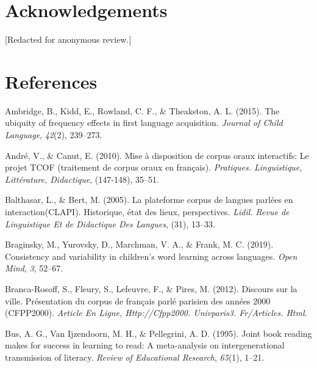 \documentclass[10pt, letterpaper]{article}
\newenvironment{CSLReferences}%
  {}%
  {\par}
\begin{document}
\hypertarget{acknowledgements}{%
\section{Acknowledgements}\label{acknowledgements}}

{[}Redacted for anonymous review.{]}

\hypertarget{references}{%
\section{References}\label{references}}

\setlength{\parindent}{-0.1in} 
\setlength{\leftskip}{0.125in}

\noindent

\hypertarget{refs}{}
\begin{CSLReferences}{1}{0}
\leavevmode\hypertarget{ref-ambridge2015ubiquity}{}%
Ambridge, B., Kidd, E., Rowland, C. F., \& Theakston, A. L. (2015). The
ubiquity of frequency effects in first language acquisition.
\emph{Journal of Child Language}, \emph{42}(2), 239--273.

\leavevmode\hypertarget{ref-andre2010mise}{}%
André, V., \& Canut, E. (2010). Mise {à} disposition de corpus oraux
interactifs: Le projet TCOF (traitement de corpus oraux en fran{ç}ais).
\emph{Pratiques. Linguistique, Litt{é}rature, Didactique}, (147-148),
35--51.

\leavevmode\hypertarget{ref-balthasar2005plateforme}{}%
Balthasar, L., \& Bert, M. (2005). La plateforme corpus de langues
parl{é}es en interaction(CLAPI). Historique, {é}tat des lieux,
perspectives. \emph{Lidil. Revue de Linguistique Et de Didactique Des
Langues}, (31), 13--33.

\leavevmode\hypertarget{ref-braginsky2019consistency}{}%
Braginsky, M., Yurovsky, D., Marchman, V. A., \& Frank, M. C. (2019).
Consistency and variability in children's word learning across
languages. \emph{Open Mind}, \emph{3}, 52--67.

\leavevmode\hypertarget{ref-branca2012discours}{}%
Branca-Rosoff, S., Fleury, S., Lefeuvre, F., \& Pires, M. (2012).
Discours sur la ville. Pr{é}sentation du corpus de fran{ç}ais parl{é}
parisien des ann{é}es 2000 (CFPP2000). \emph{Article En Ligne,
Http://Cfpp2000. Univparis3. Fr/Articles. Html}.

\leavevmode\hypertarget{ref-bus1995joint}{}%
Bus, A. G., Van Ijzendoorn, M. H., \& Pellegrini, A. D. (1995). Joint
book reading makes for success in learning to read: A meta-analysis on
intergenerational transmission of literacy. \emph{Review of Educational
Research}, \emph{65}(1), 1--21.


\end{CSLReferences}
\end{document}
